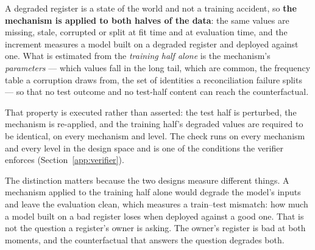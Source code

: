 A degraded register is a state of the world and not a training accident, so
\textbf{the mechanism is applied to both halves of the data}: the same values
are missing, stale, corrupted or split at fit time and at evaluation time, and
the increment measures a model built on a degraded register and deployed
against one. What is estimated from the \emph{training half alone} is the
mechanism's \emph{parameters} --- which values fall in the long tail, which are
common, the frequency table a corruption draws from, the set of identities a
reconciliation failure splits --- so that no test outcome and no test-half
content can reach the counterfactual.

That property is executed rather than asserted: the test half is perturbed,
the mechanism is re-applied, and the training half's degraded values are
required to be identical, on every mechanism and level. The check runs on
every mechanism and every level in the design space and is one of the
conditions the verifier enforces
(Section~\ref{app:verifier}).

The distinction matters because the two designs measure different things. A
mechanism applied to the training half alone would degrade the model's inputs
and leave the evaluation clean, which measures a train--test mismatch: how
much a model built on a bad register loses when deployed against a good one.
That is not the question a register's owner is asking. The owner's register is
bad at both moments, and the counterfactual that answers the question degrades
both.
